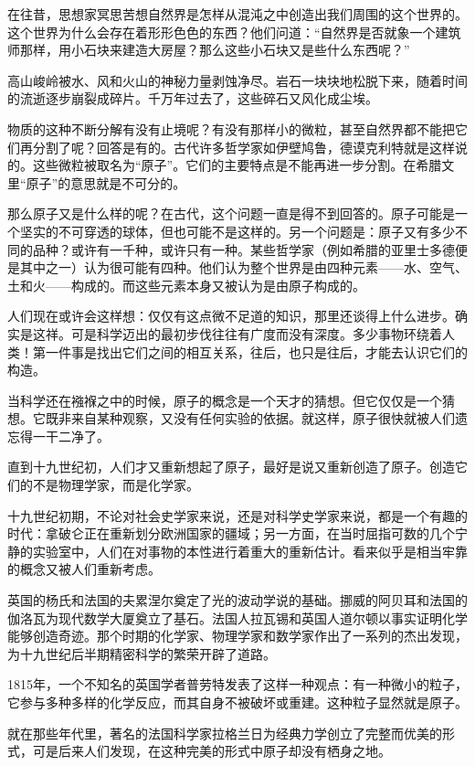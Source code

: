 在往昔，思想家冥思苦想自然界是怎样从混沌之中创造出我们周围的这个世界的。这个世界为什么会存在着形形色色的东西？他们问道：“自然界是否就象一个建筑师那样，用小石块来建造大房屋？那么这些小石块又是些什么东西呢？”

高山峻岭被水、风和火山的神秘力量剥蚀净尽。岩石一块块地松脱下来，随着时间的流逝逐步崩裂成碎片。千万年过去了，这些碎石又风化成尘埃。

物质的这种不断分解有没有止境呢？有没有那样小的微粒，甚至自然界都不能把它们再分割了呢？回答是有的。古代许多哲学家如伊壁鸠鲁，德谟克利特就是这样说的。这些微粒被取名为“原子”。它们的主要特点是不能再进一步分割。在希腊文里“原子”的意思就是不可分的。

那么原子又是什么样的呢？在古代，这个问题一直是得不到回答的。原子可能是一个坚实的不可穿透的球体，但也可能不是这样的。另一个问题是：原子又有多少不同的品种？或许有一千种，或许只有一种。某些哲学家（例如希腊的亚里士多德便是其中之一）认为很可能有四种。他们认为整个世界是由四种元素——水、空气、土和火——构成的。而这些元素本身又被认为是由原子构成的。

人们现在或许会这样想：仅仅有这点微不足道的知识，那里还谈得上什么进步。确实是这祥。可是科学迈出的最初步伐往往有广度而没有深度。多少事物环绕着人类！第一件事是找出它们之间的相互关系，往后，也只是往后，才能去认识它们的构造。

当科学还在襁褓之中的时候，原子的概念是一个天才的猜想。但它仅仅是一个猜想。它既非来自某种观察，又没有任何实验的依据。就这样，原子很快就被人们遗忘得一干二净了。

直到十九世纪初，人们才又重新想起了原子，最好是说又重新创造了原子。创造它们的不是物理学家，而是化学家。

十九世纪初期，不论对社会史学家来说，还是对科学史学家来说，都是一个有趣的时代：拿破仑正在重新划分欧洲国家的疆域；另一方面，在当时屈指可数的几个宁静的实验室中，人们在对事物的本性进行着重大的重新估计。看来似乎是相当牢靠的概念又被人们重新考虑。

英国的杨氏和法国的夫累涅尔奠定了光的波动学说的基础。挪威的阿贝耳和法国的伽洛瓦为现代数学大厦奠立了基石。法国人拉瓦锡和英国人道尔顿以事实证明化学能够创造奇迹。那个时期的化学家、物理学家和数学家作出了一系列的杰出发现，为十九世纪后半期精密科学的繁荣开辟了道路。

1815年，一个不知名的英国学者普劳特发表了这样一种观点：有一种微小的粒子，它参与多种多样的化学反应，而其自身不被破坏或重建。这种粒子显然就是原子。

就在那些年代里，著名的法国科学家拉格兰日为经典力学创立了完整而优美的形式，可是后来人们发现，在这种完美的形式中原子却没有栖身之地。

